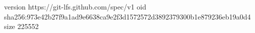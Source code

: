 version https://git-lfs.github.com/spec/v1
oid sha256:973e42b27f9a1ad9e6638ca9e2f3d1572572d3892379300b1e879236eb19a0d4
size 225552
